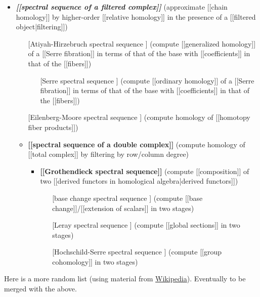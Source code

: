 \documentclass[12pt,titlepage]{article}
\theoremstyle{plain}
\theoremstyle{definition}
\theoremstyle{remark}
\begin{document}
\begin{itemize}%
\item \textbf{\emph{[[spectral sequence of a filtered complex]]}} (approximate [[chain homology]] by higher-order [[relative homology]] in the presence of a [[filtered object|filtering]])

\begin{itemize}%
\item [[Atiyah-Hirzebruch spectral sequence]] (compute [[generalized homology]] of a [[Serre fibration]] in terms of that of the base with [[coefficients]] in that of the [[fibers]])

\begin{itemize}%
\item [[Serre spectral sequence]] (compute [[ordinary homology]] of a [[Serre fibration]] in terms of that of the base with [[coefficients]] in that of the [[fibers]])

\end{itemize}

\item [[Eilenberg-Moore spectral sequence]] (compute homology of [[homotopy fiber products]])


\item \textbf{[[spectral sequence of a double complex]]} (compute homology of [[total complex]] by filtering by row/column degree)

\begin{itemize}%
\item \textbf{[[Grothendieck spectral sequence]]} (compute [[composition]] of two [[derived functors in homological algebra|derived functors]])

\begin{itemize}%
\item [[base change spectral sequence]] (compute [[base change]]/[[extension of scalars]] in two stages)


\item [[Leray spectral sequence]] (compute [[global sections]] in two stages)


\item [[Hochschild-Serre spectral sequence]] (compute [[group cohomology]] in two stages)



\end{itemize}


\end{itemize}


\end{itemize}


\end{itemize}
Here is a more random list (using material from \hyperlink{Wikipedia}{Wikipedia}). Eventually to be merged with the above.
\end{document}
